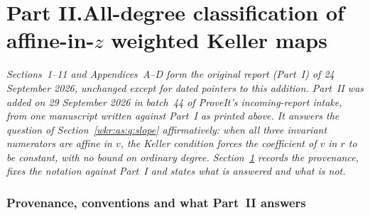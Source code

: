 \documentclass[11pt,a4paper]{article}
\numberwithin{equation}{section}
\theoremstyle{definition}
\theoremstyle{remark}
\begin{document}
\clearpage
{}\part*{Part II.\quad All-degree classification of affine-in-\texorpdfstring{$z$}{z} weighted Keller maps}

\noindent\emph{Sections~1--11 and Appendices~A--D form
the original report (Part~I) of 24 September 2026, unchanged except for
dated pointers to this addition. Part~II was added on 29 September 2026 in
batch~44 of ProveIt's incoming-report intake, from one manuscript written
against Part~I as printed above. It answers the question of
Section~\ref{wkr:as:q:slope} affirmatively: when all three invariant
numerators are affine in $v$, the Keller condition forces the coefficient
of $v$ in $r$ to be constant, with no bound on ordinary degree.
Section~\ref{wkr:as:sec:provenance} records the provenance, fixes the
notation against Part~I and states what is answered and what is not.}

\section{Provenance, conventions and what Part~II answers}
\label{wkr:as:sec:provenance}
\end{document}

